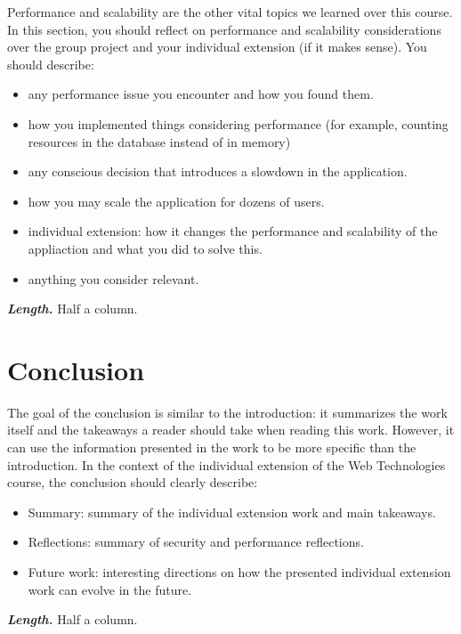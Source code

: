\documentclass[letterpaper,twocolumn]{article}
\newcommand{\myparagraph}[1]{\vspace{0.1cm}\noindent \textbf{\textit{#1.}}}
\begin{document}
Performance and scalability are the other vital topics we learned over this course. 
In this section, you should reflect on performance and scalability considerations over the group project and your individual extension (if it makes sense). 
You should describe:
\begin{itemize}
    \item any performance issue you encounter and how you found them.
    \item how you implemented things considering performance (for example, counting resources in the database instead of in memory)
    \item any conscious decision that introduces a slowdown in the application.
    \item how you may scale the application for dozens of users.
    \item individual extension: how it changes the performance and scalability of the appliaction and what you did to solve this.
    \item anything you consider relevant.
  \end{itemize}

\myparagraph{Length} Half a column.

\section{Conclusion}
The goal of the conclusion is similar to the introduction: it summarizes the work itself and the takeaways a reader should take when reading this work. 
However, it can use the information presented in the work to be more specific than the introduction. 
In the context of the individual extension of the Web Technologies course, the conclusion should clearly describe:
\begin{itemize}
  \item Summary: summary of the individual extension work and main takeaways.
  \item Reflections: summary of security and performance reflections.
  \item Future work: interesting directions on how the presented individual extension work can evolve in the future.
\end{itemize}

\myparagraph{Length} Half a column.
\end{document}
